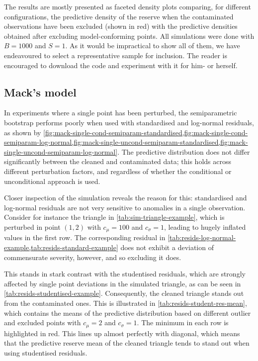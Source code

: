 \documentclass[a4paper]{book}
\begin{document}
The results are mostly presented as faceted density plots comparing, for different configurations, the predictive density of the reserve when the contaminated observations have been excluded (shown in red) with the predictive densities obtained after excluding model-conforming points. All simulations were done with $B = 1000$ and $S = 1$. As it would be impractical to show all of them, we have endeavoured to select a representative sample for inclusion. The reader is encouraged to download the code and experiment with it for him- or herself.

\subsection{Mack's model} \label{subsec:mack-sim-res}

In experiments where a single point has been perturbed, the semiparametric bootstrap performs poorly when used with standardised and log-normal residuals, as shown by \cref{fig:mack-single-cond-semiparam-standardised,fig:mack-single-cond-semiparam-log-normal,fig:mack-single-uncond-semiparam-standardised,fig:mack-single-uncond-semiparam-log-normal}. The predictive distribution does not differ significantly between the cleaned and contaminated data; this holds across different perturbation factors, and regardless of whether the conditional or unconditional approach is used.

Closer inspection of the simulation reveals the reason for this: standardised and log-normal residuals are not very sensitive to anomalies in a single observation. Consider for instance the triangle in \cref{tab:sim-triangle-example}, which is perturbed in point $(1, 2)$ with $c_\mu = 100$ and $c_\sigma = 1$, leading to hugely inflated values in the first row. The corresponding residual in \cref{tab:resids-log-normal-example,tab:resids-standard-example} does not exhibit a deviation of commensurate severity, however, and so excluding it does.

This stands in stark contrast with the studentised residuals, which are strongly affected by single point deviations in the simulated triangle, as can be seen in \cref{tab:resids-studentised-example}. Consequently, the cleaned triangle stands out from the contaminated ones. This is illustrated in \cref{tab:resids-student-res-mean}, which contains the means of the predictive distribution based on different outlier and excluded points with $c_\mu = 2$ and $c_\sigma = 1$. The minimum in each row is highlighted in red. This lines up almost perfectly with diagonal, which means that the predictive reserve mean of the cleaned triangle tends to stand out when using studentised residuals.
\end{document}
